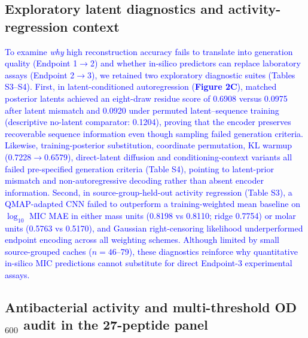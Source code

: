 \documentclass[unnumsec,webpdf,contemporary,large]{oup-authoring-template}
\newcommand{\rev}[1]{\textcolor{blue}{#1}}
\begin{document}
\subsection{Exploratory latent diagnostics and activity-regression context}

\rev{To examine \emph{why} high reconstruction accuracy fails to translate into generation quality (Endpoint 1$\rightarrow$2) and whether in-silico predictors can replace laboratory assays (Endpoint 2$\rightarrow$3), we retained two exploratory diagnostic suites (Tables S3--S4). First, in latent-conditioned autoregression (\textbf{Figure 2C}), matched posterior latents achieved an eight-draw residue score of 0.6908 versus 0.0975 after latent mismatch and 0.0920 under permuted latent--sequence training (descriptive no-latent comparator: 0.1204), proving that the encoder preserves recoverable sequence information even though sampling failed generation criteria. Likewise, training-posterior substitution, coordinate permutation, KL warmup (0.7228$\rightarrow$0.6579), direct-latent diffusion and conditioning-context variants all failed pre-specified generation criteria (Table S4), pointing to latent-prior mismatch and non-autoregressive decoding rather than absent encoder information. Second, in source-group-held-out activity regression (Table S3), a QMAP-adapted CNN \cite{ref13,ref12} failed to outperform a training-weighted mean baseline on $\log_{10}$ MIC MAE in either mass units (0.8198 vs 0.8110; ridge 0.7754) or molar units (0.5763 vs 0.5170), and Gaussian right-censoring likelihood underperformed endpoint encoding across all weighting schemes. Although limited by small source-grouped caches ($n=46$--79), these diagnostics reinforce why quantitative in-silico MIC predictions cannot substitute for direct Endpoint-3 experimental assays.}

\subsection{Antibacterial activity and multi-threshold OD$_{600}$ audit in the 27-peptide panel}
\end{document}
